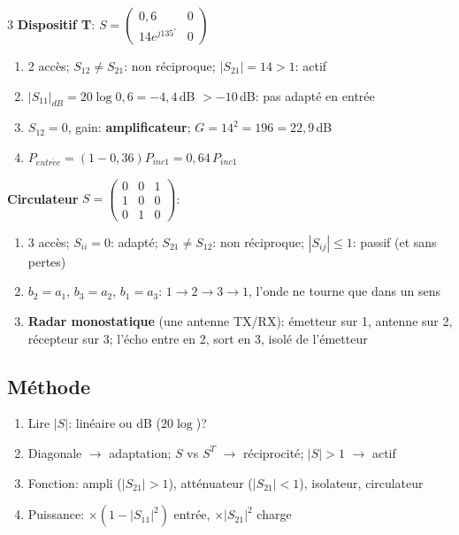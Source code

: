 \documentclass[12pt, a4paper]{article}
\begin{document}
\begin{multicols*}{3}
	\textbf{Dispositif T}: $S=\begin{pmatrix}0{,}6&0\\14e^{j135^\circ}&0\end{pmatrix}$
	\begin{enumerate}[\roman*.]
		\item 2 accès; $S_{12}\neq S_{21}$: non réciproque; $|S_{21}|=14>1$: actif
		\item $|S_{11}|_{dB}=20\log0{,}6=-4{,}4$\,dB $>-10$\,dB: pas adapté en entrée
		\item $S_{12}=0$, gain: \textbf{amplificateur}; $G=14^2=196=22{,}9$\,dB
		\item $P_{entr\acute ee}=(1-0{,}36)P_{inc1}=0{,}64\,P_{inc1}$
	\end{enumerate}

	\textbf{Circulateur} $S=\begin{pmatrix}0&0&1\\1&0&0\\0&1&0\end{pmatrix}$:
	\begin{enumerate}[\roman*.]
		\item 3 accès; $S_{ii}=0$: adapté; $S_{21}\neq S_{12}$: non réciproque; $|S_{ij}|\leq1$: passif (et sans pertes)
		\item $b_2=a_1$, $b_3=a_2$, $b_1=a_3$: $1\to2\to3\to1$, l'onde ne tourne que dans un sens
		\item \textbf{Radar monostatique} (une antenne TX/RX): émetteur sur 1, antenne sur 2, récepteur sur 3; l'écho entre en 2, sort en 3, isolé de l'émetteur
	\end{enumerate}

	\subsection{Méthode}
	\begin{enumerate}[\roman*.]
		\item Lire $|S|$: linéaire ou dB ($20\log$)?
		\item Diagonale $\to$ adaptation; $S$ vs $S^T$ $\to$ réciprocité; $|S|>1$ $\to$ actif
		\item Fonction: ampli ($|S_{21}|>1$), atténuateur ($|S_{21}|<1$), isolateur, circulateur
		\item Puissance: $\times(1-|S_{11}|^2)$ entrée, $\times|S_{21}|^2$ charge
	\end{enumerate}

	\colbreak

\end{multicols*}
\end{document}
